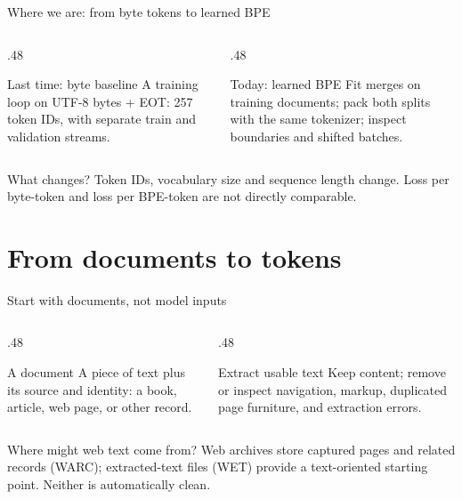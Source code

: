\documentclass[handout]{beamer}
\begin{document}
\begin{frame}{Where we are: from byte tokens to learned BPE}
  \begin{columns}[t]
    \begin{column}{.48\linewidth}
      \begin{block}{Last time: byte baseline}
        A training loop on UTF-8 bytes + EOT: 257 token IDs, with separate train and validation streams.
      \end{block}
    \end{column}
    \begin{column}{.48\linewidth}
      \begin{block}{Today: learned BPE}
        Fit merges on training documents; pack both splits with the same tokenizer; inspect boundaries and shifted batches.
      \end{block}
    \end{column}
  \end{columns}
  \vfill
  \begin{alertblock}{What changes?}
    Token IDs, vocabulary size and sequence length change. Loss per byte-token and loss per BPE-token are not directly comparable.
  \end{alertblock}
\end{frame}

\section{From documents to tokens}

\begin{frame}{Start with documents, not model inputs}
  \begin{columns}[t]
    \begin{column}{.48\linewidth}
      \begin{block}{A document}
        A piece of text plus its source and identity: a book, article, web page, or other record.
      \end{block}
    \end{column}
    \begin{column}{.48\linewidth}
      \begin{block}{Extract usable text}
        Keep content; remove or inspect navigation, markup, duplicated page furniture, and extraction errors.
      \end{block}
    \end{column}
  \end{columns}
  \vfill
  \begin{alertblock}{Where might web text come from?}
    Web archives store captured pages and related records (WARC); extracted-text files (WET) provide a text-oriented starting point. Neither is automatically clean.
  \end{alertblock}
\end{frame}
\end{document}
